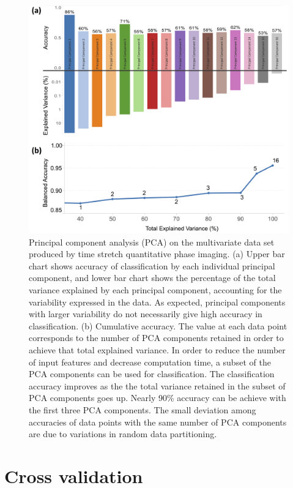 \documentclass[aps,pra,reprint,longbibliography,groupedaddress]{revtex4-1}
\begin{document}
\begin{figure}
\includegraphics[scale=0.1]{FigurePCA.jpg}
\caption{\label{fig:PCA} 
Principal component analysis (PCA) on the multivariate data set produced by time stretch quantitative phase imaging. (a) Upper bar chart shows accuracy of classification by each individual principal component, and lower bar chart shows the percentage of the total variance explained by each principal component, accounting for the variability expressed in the data. As expected, principal components with larger variability do not necessarily give high accuracy in classification. (b) Cumulative accuracy. The value at each data point corresponds to the number of PCA components retained in order to achieve that total explained variance. In order to reduce the number of input features and decrease computation time, a subset of the PCA components can be used for classification. The classification accuracy improves as the the total variance retained in the subset of PCA components goes up. Nearly 90\% accuracy can be achieve with the first three PCA components. The small deviation among accuracies of data points with the same number of PCA components are due to variations in random data partitioning.}
\end{figure}

\section{\label{scn:CrossValidation}Cross validation} 
\end{document}
